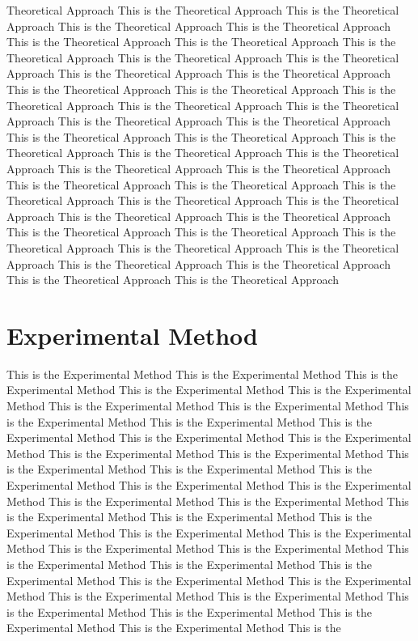 \documentclass[twocolumn,a4paper,10pt,twoside]{article}
\begin{document}
Theoretical Approach This is the Theoretical Approach This is the Theoretical Approach This is the Theoretical Approach This is the Theoretical Approach This is the Theoretical Approach This is the Theoretical Approach This is the Theoretical Approach This is the Theoretical Approach This is the Theoretical Approach This is the Theoretical Approach This is the Theoretical Approach This is the Theoretical Approach This is the Theoretical Approach This is the Theoretical Approach This is the Theoretical Approach This is the Theoretical Approach This is the Theoretical Approach This is the Theoretical Approach This is the Theoretical Approach This is the Theoretical Approach This is the Theoretical Approach This is the Theoretical Approach This is the Theoretical Approach This is the Theoretical Approach This is the Theoretical Approach This is the Theoretical Approach This is the Theoretical Approach This is the Theoretical Approach This is the Theoretical Approach This is the Theoretical Approach This is the Theoretical Approach This is the Theoretical Approach This is the Theoretical Approach This is the Theoretical Approach This is the Theoretical Approach This is the Theoretical Approach This is the Theoretical Approach This is the Theoretical Approach This is the Theoretical Approach This is the Theoretical Approach This is the Theoretical Approach



\section{Experimental Method}
This is the Experimental Method This is the Experimental Method This is the Experimental Method This is the Experimental Method This is the Experimental Method This is the Experimental Method This is the Experimental Method This is the Experimental Method This is the Experimental Method This is the Experimental Method This is the Experimental Method This is the Experimental Method This is the Experimental Method This is the Experimental Method This is the Experimental Method This is the Experimental Method This is the Experimental Method This is the Experimental Method This is the Experimental Method This is the Experimental Method This is the Experimental Method This is the Experimental Method This is the Experimental Method This is the Experimental Method This is the Experimental Method This is the Experimental Method This is the Experimental Method This is the Experimental Method This is the Experimental Method This is the Experimental Method This is the Experimental Method This is the Experimental Method This is the Experimental Method This is the Experimental Method This is the Experimental Method This is the Experimental Method This is the Experimental Method This is the Experimental Method This is the Experimental Method This is the 
\end{document}
